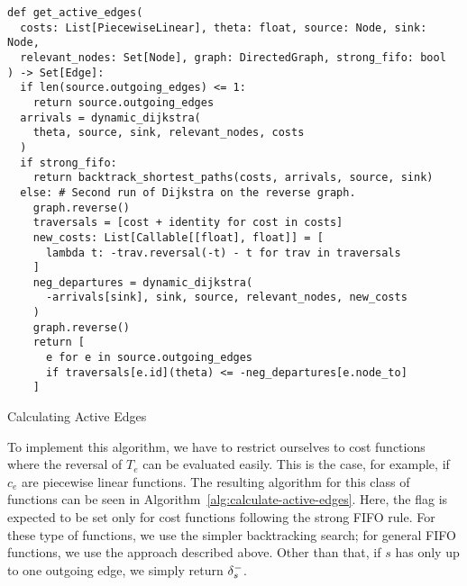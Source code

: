 \begin{algorithm}[ht]
    \begin{verbatim}
def get_active_edges(
  costs: List[PiecewiseLinear], theta: float, source: Node, sink: Node,
  relevant_nodes: Set[Node], graph: DirectedGraph, strong_fifo: bool
) -> Set[Edge]:
  if len(source.outgoing_edges) <= 1:
    return source.outgoing_edges
  arrivals = dynamic_dijkstra(
    theta, source, sink, relevant_nodes, costs
  )
  if strong_fifo:
    return backtrack_shortest_paths(costs, arrivals, source, sink)
  else: # Second run of Dijkstra on the reverse graph.
    graph.reverse()
    traversals = [cost + identity for cost in costs]
    new_costs: List[Callable[[float], float]] = [
      lambda t: -trav.reversal(-t) - t for trav in traversals
    ]
    neg_departures = dynamic_dijkstra(
      -arrivals[sink], sink, source, relevant_nodes, new_costs
    )
    graph.reverse()
    return [
      e for e in source.outgoing_edges
      if traversals[e.id](theta) <= -neg_departures[e.node_to]
    ]
  \end{verbatim}
  \caption{Calculating Active Edges}
  \label{alg:calculate-active-edges}
\end{algorithm}


To implement this algorithm, we have to restrict ourselves to cost functions where the reversal of $T_e$ can be evaluated easily.
This is the case, for example, if $c_e$ are piecewise linear functions.
The resulting algorithm for this class of functions can be seen in Algorithm~\ref{alg:calculate-active-edges}.
Here, the flag  is expected to be set only for cost functions following the strong FIFO rule.
For these type of functions, we use the simpler backtracking search; for  general FIFO functions, we use the approach described above.
Other than that, if $s$ has only up to one outgoing edge, we simply return $\delta^-_{s}$.

